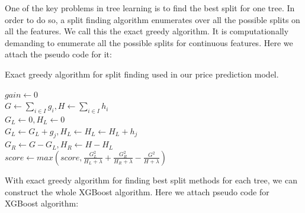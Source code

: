 \documentclass[letterpaper]{article}
\begin{document}
One of the key problems in tree learning is to find the best split for one tree. In order to do so, a split finding algorithm enumerates over all the possible splits on all the features. We call this the exact greedy algorithm. It is computationally demanding to enumerate all the possible splits for continuous features. Here we attach the pseudo code for it:

\begin{algorithm}[htbp]
            \caption{Exact greedy algorithm for split finding used in our price prediction model.}
            
            $gain \gets 0$\\
            $G \gets \sum_{i \in I} g_i, H \gets \sum_{i \in I} h_i$\\ 
            { 
            $G_L \gets 0, H_L \gets 0$\\
                { 
                    $G_L \gets G_L + g_j, H_L \gets H_L \gets H_L + h_j$\\
                    $G_R \gets G - G_L, H_R \gets H - H_L$\\
                    $score \gets max(score, \frac{G_L^2}{H_L + \lambda} + \frac{G_R^2}{H_R + \lambda} - \frac{G^2}{H + \lambda})$
                }  
            } 
            
\end{algorithm}

With exact greedy algorithm for finding best split methods for each tree, we can construct the whole XGBoost algorithm. Here we attach pseudo code for XGBoost algorithm:
\end{document}
